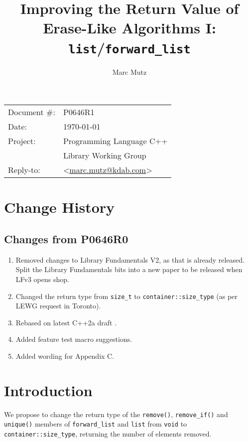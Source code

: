 \documentclass[11pt]{article}
\date{}
\title{Improving the Return Value of Erase-Like Algorithms I: \texttt{list}/\texttt{forward\_list}}
\makeatletter
\newcommand{\emailaddress}{marc.mutz@kdab.com}
\newcommand{\email}{\href{mailto:\emailaddress}{\emailaddress}}
\makeatother
\begin{document}
\maketitle\vspace{-2cm}

\begin{flushright}
  \begin{tabular}{ll}
  Document \#:&P0646R1\\
  Date:       &\today\\
  Project:    &Programming Language C++\\
              &Library Working Group\\
  Reply-to:   &\author{Marc Mutz} \textless\email\textgreater
  \end{tabular}
\end{flushright}

\section{Change History}

\subsection{Changes from P0646R0}

\begin{enumerate}
\item Removed changes to Library Fundamentals V2, as that is already
  released. Split the Library Fundamentals bits into a new paper to be
  released when LFv3 opens shop.
\item Changed the return type from \texttt{size\_t} to
  \texttt{container::size\_type} (as per LEWG request in Toronto).
\item Rebased on latest C++2a draft \cite{cpp}.
\item Added feature test macro suggestions.
\item Added wording for Appendix C.
\end{enumerate}

\section{Introduction}

We propose to change the return type of the \texttt{remove()},
\texttt{remove\_if()} and \texttt{unique()} members of
\texttt{forward\_list} and \texttt{list} from \texttt{void} to
\texttt{container::size\_type}, returning the number of elements removed.
\end{document}
